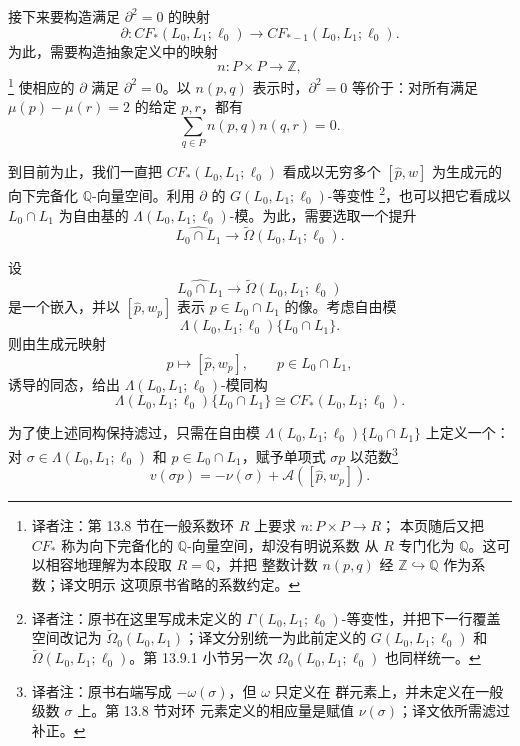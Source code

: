 接下来要构造满足 $\partial^2=0$ 的映射
\[
  \partial:CF_*(L_0,L_1;\ell_0)
  \longrightarrow CF_{*-1}(L_0,L_1;\ell_0).
\]
为此，需要构造抽象定义中的映射
\[
  n:P\times P\longrightarrow\mathbb Z,
\]
\footnote{译者注：第 13.8 节在一般系数环 $R$ 上要求 $n:P\times P\to R$；
本页随后又把 $CF_*$ 称为向下完备化的 $\mathbb Q$-向量空间，却没有明说系数
从 $R$ 专门化为 $\mathbb Q$。这可以相容地理解为本段取 $R=\mathbb Q$，并把
整数计数 $n(p,q)$ 经 $\mathbb Z\hookrightarrow\mathbb Q$ 作为系数；译文明示
这项原书省略的系数约定。}
使相应的 $\partial$ 满足 $\partial^2=0$。以 $n(p,q)$ 表示时，$\partial^2=0$
等价于：对所有满足 $\mu(p)-\mu(r)=2$ 的给定 $p,r$，都有
\begin{equation}
  \sum_{q\in P}n(p,q)n(q,r)=0.
\label{eq:boundary-square-coefficient}
\end{equation}

到目前为止，我们一直把 $CF_*(L_0,L_1;\ell_0)$ 看成以无穷多个
$[\widehat p,w]$ 为生成元的向下完备化 $\mathbb Q$-向量空间。利用 $\partial$
的 $G(L_0,L_1;\ell_0)$-等变性
\footnote{译者注：原书在这里写成未定义的
$\Gamma(L_0,L_1;\ell_0)$-等变性，并把下一行覆盖空间改记为
$\widetilde\Omega_0(L_0,L_1)$；译文分别统一为此前定义的
$G(L_0,L_1;\ell_0)$ 和
$\widetilde\Omega(L_0,L_1;\ell_0)$。第 13.9.1 小节另一次
$\Omega_0(L_0,L_1;\ell_0)$ 也同样统一。}，也可以把它看成以
$L_0\cap L_1$ 为自由基的 $\Lambda(L_0,L_1;\ell_0)$-模。为此，需要选取一个提升
\[
  \widehat{L_0\cap L_1}
  \longrightarrow\widetilde\Omega(L_0,L_1;\ell_0).
\]

\begin{proposition}
\label{prop:free-novikov-module-identification}
设
\[
  \widehat{L_0\cap L_1}
  \longrightarrow\widetilde\Omega(L_0,L_1;\ell_0)
\]
是一个嵌入，并以 $[\widehat p,w_p]$ 表示 $p\in L_0\cap L_1$ 的像。考虑自由模
\[
  \Lambda(L_0,L_1;\ell_0)\{L_0\cap L_1\}.
\]
则由生成元映射
\[
  p\longmapsto[\widehat p,w_p],
  \qquad p\in L_0\cap L_1,
\]
诱导的同态，给出 $\Lambda(L_0,L_1;\ell_0)$-模同构
\[
  \Lambda(L_0,L_1;\ell_0)\{L_0\cap L_1\}
  \cong CF_*(L_0,L_1;\ell_0).
\]
\end{proposition}

为了使上述同构保持滤过，只需在自由模
$\Lambda(L_0,L_1;\ell_0)\{L_0\cap L_1\}$ 上定义一个\termNonArchimedeanNorm{}：
对
$\sigma\in\Lambda(L_0,L_1;\ell_0)$ 和 $p\in L_0\cap L_1$，赋予单项式
$\sigma p$ 以范数\footnote{译者注：原书右端写成 $-\omega(\sigma)$，但 $\omega$ 只定义在
群元素上，并未定义在一般\personNovikov{}级数 $\sigma$ 上。第 13.8 节对\personNovikov{}环
元素定义的相应量是赋值 $\nu(\sigma)$；译文依所需滤过补正。}
\[
  v(\sigma p)
  =-\nu(\sigma)+\mathcal A([\widehat p,w_p]).
\]
